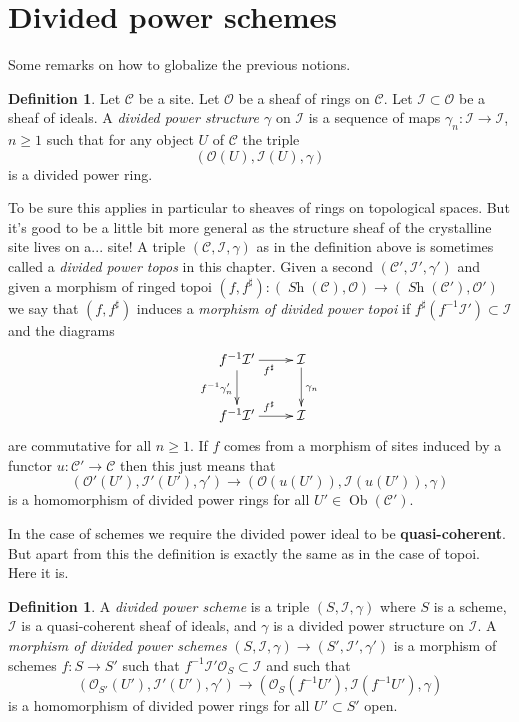 \documentclass{stacks-project}
\theoremstyle{plain}
\theoremstyle{definition}
\newtheorem{definition}[subsection]{Definition}
\theoremstyle{remark}
\numberwithin{equation}{subsection}
\def\Ob{\mathop{\mathrm{Ob}}\nolimits}
\def\Sh{\mathop{\mathit{Sh}}\nolimits}
\begin{document}
\section{Divided power schemes}
\label{section-divided-power-schemes}

\noindent
Some remarks on how to globalize the previous notions.

\begin{definition}
\label{definition-divided-power-structure}
Let $\mathcal{C}$ be a site. Let $\mathcal{O}$ be a sheaf of rings
on $\mathcal{C}$. Let $\mathcal{I} \subset \mathcal{O}$ be a
sheaf of ideals. A {\it divided power structure $\gamma$} on $\mathcal{I}$
is a sequence of maps $\gamma_n : \mathcal{I} \to \mathcal{I}$, $n \geq 1$
such that for any object $U$ of $\mathcal{C}$ the triple
$$
(\mathcal{O}(U), \mathcal{I}(U), \gamma)
$$
is a divided power ring.
\end{definition}

\noindent
To be sure this applies in particular to sheaves of rings on
topological spaces. But it's good to be a little bit more general
as the structure sheaf of the crystalline site lives on a... site!
A triple $(\mathcal{C}, \mathcal{I}, \gamma)$ as in the
definition above is sometimes called a {\it divided power topos}
in this chapter. Given a second $(\mathcal{C}', \mathcal{I}', \gamma')$ and
given a morphism of ringed topoi
$(f, f^\sharp) : (\Sh(\mathcal{C}), \mathcal{O}) \to
(\Sh(\mathcal{C}'), \mathcal{O}')$
we say that $(f, f^\sharp)$ induces a {\it morphism of divided
power topoi} if $f^\sharp(f^{-1}\mathcal{I}') \subset \mathcal{I}$
and the diagrams
$$
\xymatrix{
f^{-1}\mathcal{I}' \ar[d]_{f^{-1}\gamma'_n} \ar[r]_{f^\sharp} &
\mathcal{I} \ar[d]^{\gamma_n} \\
f^{-1}\mathcal{I}' \ar[r]^{f^\sharp} & \mathcal{I}
}
$$
are commutative for all $n \geq 1$. If $f$ comes from a morphism of
sites induced by a functor $u : \mathcal{C}' \to \mathcal{C}$ then
this just means that
$$
(\mathcal{O}'(U'), \mathcal{I}'(U'), \gamma')
\longrightarrow
(\mathcal{O}(u(U')), \mathcal{I}(u(U')), \gamma)
$$
is a homomorphism of divided power rings for all $U' \in \Ob(\mathcal{C}')$.

\medskip\noindent
In the case of schemes we require the divided power ideal to be
{\bf quasi-coherent}. But apart from this the definition is exactly
the same as in the case of topoi. Here it is.

\begin{definition}
\label{definition-divided-power-scheme}
A {\it divided power scheme} is a triple $(S, \mathcal{I}, \gamma)$
where $S$ is a scheme, $\mathcal{I}$ is a quasi-coherent sheaf of
ideals, and $\gamma$ is a divided power structure on $\mathcal{I}$.
A {\it morphism of divided power schemes}
$(S, \mathcal{I}, \gamma) \to (S', \mathcal{I}', \gamma')$ is
a morphism of schemes $f : S \to S'$ such that
$f^{-1}\mathcal{I}'\mathcal{O}_S \subset \mathcal{I}$ and such that
$$
(\mathcal{O}_{S'}(U'), \mathcal{I}'(U'), \gamma')
\longrightarrow
(\mathcal{O}_S(f^{-1}U'), \mathcal{I}(f^{-1}U'), \gamma)
$$
is a homomorphism of divided power rings for all $U' \subset S'$ open.
\end{definition}
\end{document}
